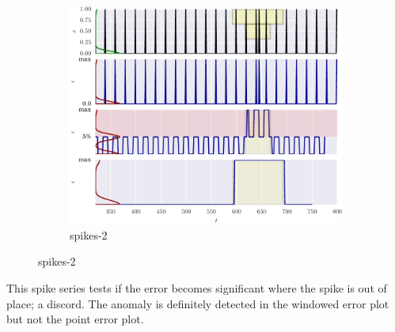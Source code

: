 \begin{figure}[!hp]
    \ContinuedFloat 
    \begin{subfigure}[t]{\textwidth}
        \centering
        \includegraphics[]{figs/er_spikereg.pdf}
        \caption{spikes-2}
    \end{subfigure}%
\end{figure}

This spike series tests if the error becomes significant where the spike is out of place; a discord.
%
The anomaly is definitely detected in the windowed error plot but not the point error plot.




